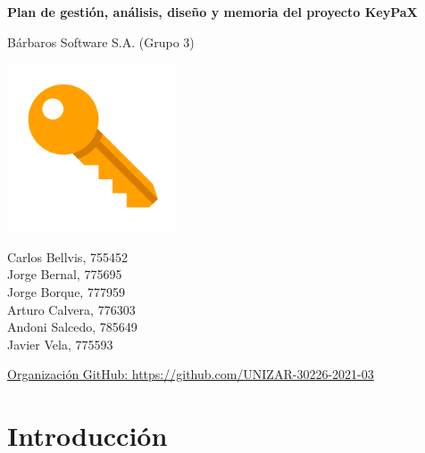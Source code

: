 \documentclass{article}
\begin{document}
\begin{titlepage}
   \centering
   \vspace*{\fill}

   \vspace*{0.5cm}

   \Huge
   \textbf{Plan de gestión, análisis, diseño y memoria del proyecto KeyPaX}

   \vspace*{0.5cm}

   \huge
   Bárbaros Software S.A. (Grupo 3)

   \includegraphics[height=5cm,angle=-45]{../images/llave.png}

   \begin{Large}
       Carlos Bellvis, 755452\\
       Jorge Bernal, 775695\\
       Jorge Borque, 777959\\
       Arturo Calvera, 776303\\
       Andoni Salcedo, 785649\\
       Javier Vela, 775593\\
   \end{Large}

   \vspace*{1cm}

   \large
   \href{https://github.com/UNIZAR-30226-2021-03}{Organización GitHub: https://github.com/UNIZAR-30226-2021-03}

   \vspace*{\fill}

\end{titlepage}

\pagebreak

\tableofcontents

\pagebreak

\section{Introducción}
\end{document}
